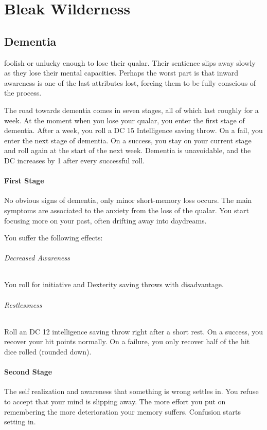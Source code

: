\chapter{Bleak Wilderness}


\section{Dementia}
foolish or unlucky enough to lose their qualar.
Their sentience slips away slowly as they lose their mental capacities.
Perhaps the worst part is that inward awareness is one of the last attributes lost, forcing them to be fully conscious of the process.

The road towards dementia comes in seven stages, all of which last roughly for a week.
At the moment when you lose your qualar, you enter the first stage of dementia.
After a week, you roll a DC 15 Intelligence saving throw.
On a fail, you enter the next stage of dementia.
On a success, you stay on your current stage and roll again at the start of the next week.
Dementia is unavoidable, and the DC increases by 1 after every successful roll.

\subsubsection{First Stage}
No obvious signs of dementia, only minor short-memory loss occurs.
The main symptoms are associated to the anxiety from the loss of the qualar.
You start focusing more on your past, often drifting away into daydreams.

You suffer the following effects:
\subparagraph{Decreased Awareness} You roll for initiative and Dexterity saving throws with disadvantage.
\subparagraph{Restlessness} Roll an DC 12 intelligence saving throw right after a short rest.
On a success, you recover your hit points normally.
On a failure, you only recover half of the hit dice rolled (rounded down).

\subsubsection{Second Stage}
The self realization and awareness that something is wrong settles in.
You refuse to accept that your mind is slipping away.
The more effort you put on remembering the more deterioration your memory suffers.
Confusion starts setting in.

